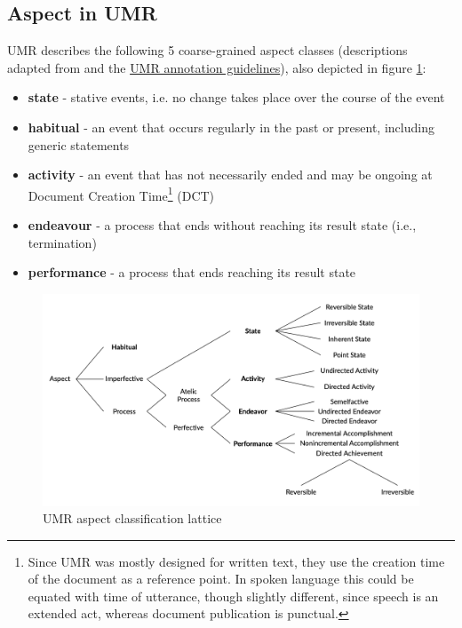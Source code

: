 \subsection*{Aspect in UMR}
\label{aspect_in_umr}
UMR describes the following 5 coarse-grained aspect classes (descriptions adapted from \citet{umr} and the \href{https://github.com/umr4nlp/umr-guidelines/blob/master/guidelines.md}{UMR annotation guidelines}), also depicted in figure \ref{fig:umr_aspect_tree}:
\begin{itemize}
    \item \textbf{state} - stative events, i.e. no change takes place over the course of the event
    \item \textbf{habitual} - an event that occurs regularly in the past or
    present, including generic statements
    \item \textbf{activity} - an event that has not necessarily ended and may
    be ongoing at Document Creation Time\footnote{Since UMR was mostly designed for written text, they use the creation time of the document as a reference point. In spoken language this could be equated with time of utterance, though slightly different, since speech is an extended act, whereas document publication is punctual.} (DCT)
    \item \textbf{endeavour} - a process that ends without reaching its result state
    (i.e., termination)
    \item \textbf{performance} - a process that ends reaching its result state
\end{itemize}

\begin{figure}
    \includegraphics[width=\textwidth]{img/umr_aspct_tree.png}
    \caption{UMR aspect classification lattice \citep{umrslides2022}}
    \label{fig:umr_aspect_tree}
\end{figure}

